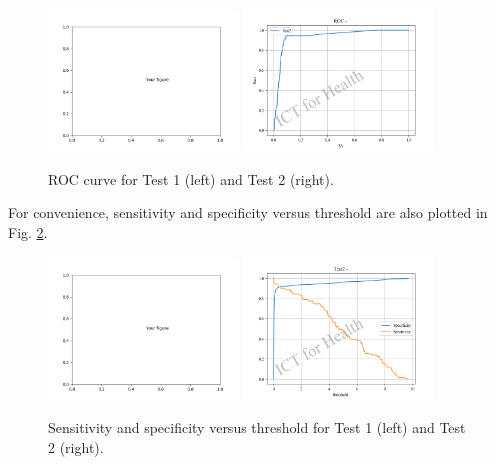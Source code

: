 \documentclass[12pt]{article}
\begin{document}
\begin{figure}[ht]
    \centering
    \includegraphics[width=0.45\textwidth]{./figures/empty_fig.png}
    \includegraphics[width=0.45\textwidth]{./figures/Figure_ROC.png}
    \caption{ROC curve for Test 1 (left) and Test 2 (right).}
    \label{fig:ROC}
\end{figure}
For convenience, sensitivity and specificity versus threshold are also plotted in Fig. \ref{fig:sens_spec_thresh}.

\begin{figure}[ht]
    \centering
    \includegraphics[width=0.45\textwidth]{./figures/empty_fig.png}
    \includegraphics[width=0.45\textwidth]{./figures/Figure_sens_spec_thresh.png}
    \caption{Sensitivity and specificity versus threshold for Test 1 (left) and Test 2 (right).}
    \label{fig:sens_spec_thresh}
\end{figure}
\end{document}
